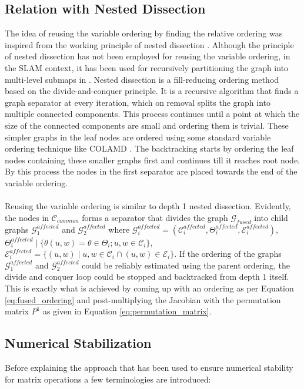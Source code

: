 \subsection{Relation with Nested Dissection}
The idea of reusing the variable ordering by finding the relative ordering was inspired from the working principle of nested dissection \cite{nesdis}. Although the principle of nested dissection has not been employed for reusing the variable ordering, in the SLAM context, it has been used for recursively partitioning the graph into multi-level submaps in \cite{nesdisslam}. Nested dissection is a fill-reducing ordering method based on the divide-and-conquer principle. It is a recursive algorithm that finds a graph separator at every iteration, which on removal splits the graph into multiple connected components. This process continues until a point at which the size of the connected components are small and ordering them is trivial. These simpler graphs in the leaf nodes  are ordered using some standard variable ordering technique like COLAMD \citep{colamd}. The backtracking starts by ordering the leaf nodes containing these smaller graphs first and continues till it reaches root node. By this process the nodes in the first separator are placed towards the end of the variable ordering. 
\paragraph{}
Reusing the variable ordering is similar to depth 1 nested dissection. Evidently, the nodes in $\mathcal{C}_{common}$ forms a separator that divides the graph $\mathcal{G}_{fused}$ into child graphs $\mathcal{G}_1^{affected}$ and $\mathcal{G}_2^{affected}$ where $\mathcal{G}^{affected}_i = (\mathcal{C}^{affected}_i, \Theta^{affected}_i ,\mathcal{E}^{affected}_i)$, $\Theta^{affected}_i \mid \{ \theta(u,w) = \theta \in \Theta_i; u, w \in \mathcal{C}_i \} $, $\mathcal{E}^{affected}_i = \{ (u,w) \mid u, w \in \mathcal{C}_i \cap (u,w)\in \mathcal{E}_i \}$. If the ordering of the graphs $\mathcal{G}_1^{affected}$ and $\mathcal{G}_2^{affected}$ could be reliably estimated using the parent ordering, the divide and conquer loop could be stopped and backtracked from depth 1 itself. This is exactly what is achieved by coming up with an ordering as per Equation \ref{eq:fused_ordering} and post-multiplying the Jacobian with the permutation matrix $P^1$ as given in Equation \ref{eq:permutation_matrix}.

\subsection{Numerical Stabilization}
Before explaining the approach that has been used to ensure numerical stability for matrix operations a few terminologies are introduced:
